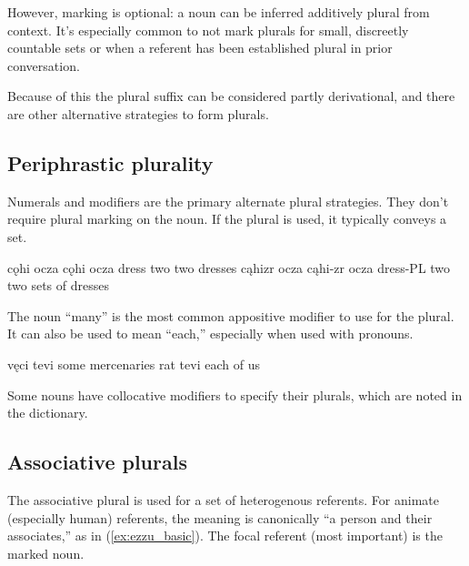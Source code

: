 However, marking is optional: a noun can be inferred additively plural from context.  It's especially common to not mark plurals for small, discreetly countable sets or when a referent has been established plural in prior conversation. 

Because of this the plural suffix can be considered partly derivational, and there are other alternative strategies to form plurals.

\subsection{Periphrastic plurality}
Numerals and modifiers are the primary alternate plural strategies. They don't require plural marking on the noun. If the plural is used, it typically conveys a set.

\begin{subexamples}
    \ex \script cǫhi ocza
    \bits cǫhi ocza
    \gloss dress two
    \tr two dresses
    \ex \script cąhizr ocza
    \bits cąhi-zr ocza
    \gloss dress-PL two
    \tr two sets of dresses
\end{subexamples}

The noun  “many” is the most common appositive modifier to use for the plural. It can also be used to mean “each,” especially when used with pronouns.%

\begin{subexamples}
    \ex \label{ex:tevi_plural}
        \script vęci tevi
        \tr some mercenaries
    \ex
        \script rat tevi
        \tr each of us
\end{subexamples}

Some nouns have collocative modifiers to specify their plurals, which are noted in the dictionary.

\subsection{Associative plurals}
The associative plural is used for a set of heterogenous referents. For animate (especially human) referents, the meaning is canonically “a person and their associates,” as in (\ref{ex:ezzu_basic}). The focal referent (\ie most important) is the marked noun.

